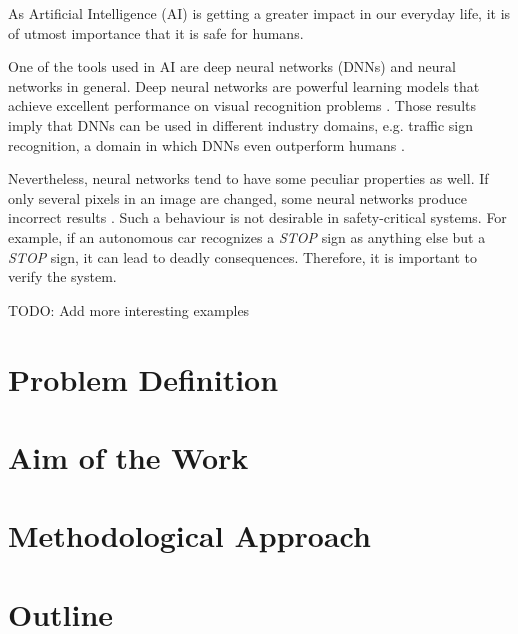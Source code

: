 As Artificial Intelligence (AI) is getting a greater impact in our everyday life, it is of utmost importance that it is safe for humans.  

One of the tools used in AI are deep neural networks (DNNs) and neural networks in general. Deep neural networks are powerful learning models that achieve excellent performance on visual recognition problems \cite{krizhevsky2012imagenet}. Those results imply that DNNs can be used in different industry domains, e.g. traffic sign recognition, a domain in which DNNs even outperform humans \cite{outperformhumans}. 

Nevertheless, neural networks tend to have some peculiar properties as well. If only several pixels in an image are changed, some neural networks produce incorrect results \cite{szegedy2013intriguing}. Such a behaviour is not desirable in safety-critical systems. For example, if an autonomous car recognizes a  \textit{STOP} sign as anything else but a \textit{STOP} sign, it can lead to deadly consequences. Therefore, it is important to verify the system. 

TODO: Add more interesting examples

\section{Problem Definition} 
\label{motivation}


\section{Aim of the Work}


\section{Methodological Approach} \label{approach}


\section{Outline} 


